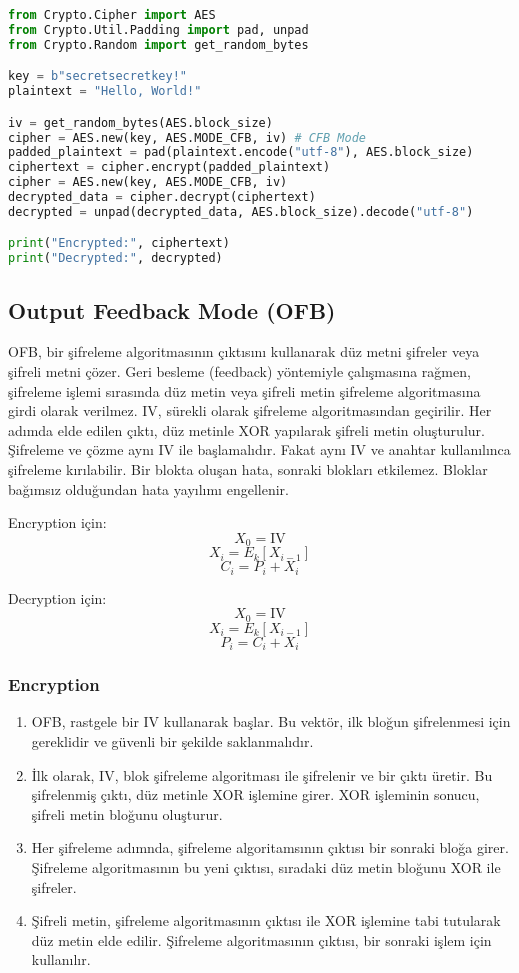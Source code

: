 \begin{lstlisting}[language=Python]
from Crypto.Cipher import AES
from Crypto.Util.Padding import pad, unpad
from Crypto.Random import get_random_bytes

key = b"secretsecretkey!"
plaintext = "Hello, World!"

iv = get_random_bytes(AES.block_size)
cipher = AES.new(key, AES.MODE_CFB, iv) # CFB Mode
padded_plaintext = pad(plaintext.encode("utf-8"), AES.block_size)
ciphertext = cipher.encrypt(padded_plaintext)
cipher = AES.new(key, AES.MODE_CFB, iv)
decrypted_data = cipher.decrypt(ciphertext)
decrypted = unpad(decrypted_data, AES.block_size).decode("utf-8")

print("Encrypted:", ciphertext)
print("Decrypted:", decrypted)
\end{lstlisting}

\newpage

\subsection{Output Feedback Mode (OFB)}

OFB, bir şifreleme algoritmasının çıktısını kullanarak düz metni şifreler veya şifreli metni çözer. Geri besleme (feedback) yöntemiyle çalışmasına rağmen, şifreleme işlemi sırasında düz metin veya şifreli metin şifreleme algoritmasına girdi olarak verilmez. IV, sürekli olarak şifreleme algoritmasından geçirilir. Her adımda elde edilen çıktı, düz metinle XOR yapılarak şifreli metin oluşturulur. Şifreleme ve çözme aynı IV ile başlamalıdır. Fakat aynı IV ve anahtar kullanılınca şifreleme kırılabilir. Bir blokta oluşan hata, sonraki blokları etkilemez. Bloklar bağımsız olduğundan hata yayılımı engellenir.

Encryption için:
\[ X_0 = \text{IV} \]
\[ X_i = E_k [X_{i-1}] \]
\[ C_i = P_i + X_i \]

Decryption için:
\[ X_0 = \text{IV} \]
\[ X_i = E_k [X_{i-1}] \]
\[ P_i = C_i + X_i \]

\subsubsection{Encryption}

\begin{enumerate}
    \item OFB, rastgele bir IV kullanarak başlar. Bu vektör, ilk bloğun şifrelenmesi için gereklidir ve güvenli bir şekilde saklanmalıdır.
    \item İlk olarak, IV, blok şifreleme algoritması ile şifrelenir ve bir çıktı üretir. Bu şifrelenmiş çıktı, düz metinle XOR işlemine girer. XOR işleminin sonucu, şifreli metin bloğunu oluşturur.
    \item Her şifreleme adımnda, şifreleme algoritamsının çıktısı bir sonraki bloğa girer. Şifreleme algoritmasının bu yeni çıktısı, sıradaki düz metin bloğunu XOR ile şifreler.
    \item Şifreli metin, şifreleme algoritmasının çıktısı ile XOR işlemine tabi tutularak düz metin elde edilir. Şifreleme algoritmasının çıktısı, bir sonraki işlem için kullanılır.
\end{enumerate}

